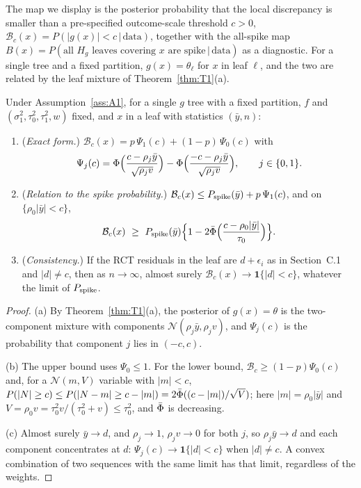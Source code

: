 \documentclass[11pt]{article}
\newcommand{\Normal}{\mathcal{N}}
\newcommand{\given}{\,\vert\,}
\theoremstyle{definition}
\theoremstyle{plain}
\begin{document}
{The map we display is the posterior probability that the local discrepancy is smaller than a pre-specified outcome-scale threshold $c>0$, $\mathcal B_c(x)=P(|g(x)|<c\given\text{data})$, together with the all-spike map $B(x)=P(\text{all }H_g\text{ leaves covering }x\text{ are spike}\given\text{data})$ as a diagnostic. For a single tree and a fixed partition, $g(x)=\theta_\ell$ for $x$ in leaf $\ell$, and the two are related by the leaf mixture of Theorem~\ref{thm:T1}(a).

\begin{thmA}\label{thm:gmap}
Under Assumption~\ref{ass:A1}, for a single $g$ tree with a fixed partition, $f$ and $(\sigma_1^2,\tau_0^2,\tau_1^2,w)$ fixed, and $x$ in a leaf with statistics $(\bar y,n)$:
\begin{enumerate}[label=(\alph*),leftmargin=2.2em]
\item (\emph{Exact form.}) $\mathcal B_c(x)=p\,\Psi_1(c)+(1-p)\,\Psi_0(c)$ with
\[
\Psi_j(c)=\Phi\Bigl(\frac{c-\rho_j\bar y}{\sqrt{\rho_jv}}\Bigr)-\Phi\Bigl(\frac{-c-\rho_j\bar y}{\sqrt{\rho_jv}}\Bigr),\qquad j\in\{0,1\}.
\]
\item (\emph{Relation to the spike probability.}) $\mathcal B_c(x)\le P_{\mathrm{spike}}(\bar y)+p\,\Psi_1(c)$, and on $\{\rho_0|\bar y|<c\}$,
\[
\mathcal B_c(x)\ \ge\ P_{\mathrm{spike}}(\bar y)\Bigl\{1-2\bar\Phi\Bigl(\frac{c-\rho_0|\bar y|}{\tau_0}\Bigr)\Bigr\}.
\]
\item (\emph{Consistency.}) If the RCT residuals in the leaf are $d+\epsilon_i$ as in Section~C.1 and $|d|\ne c$, then as $n\to\infty$, almost surely $\mathcal B_c(x)\to\mathbf 1\{|d|<c\}$, whatever the limit of $P_{\mathrm{spike}}$.
\end{enumerate}
\end{thmA}

\begin{proof}
(a) By Theorem~\ref{thm:T1}(a), the posterior of $g(x)=\theta$ is the two-component mixture with components $\Normal(\rho_j\bar y,\rho_jv)$, and $\Psi_j(c)$ is the probability that component $j$ lies in $(-c,c)$.

(b) The upper bound uses $\Psi_0\le1$. For the lower bound, $\mathcal B_c\ge(1-p)\Psi_0(c)$ and, for a $\Normal(m,V)$ variable with $|m|<c$, $P(|N|\ge c)\le P(|N-m|\ge c-|m|)=2\bar\Phi((c-|m|)/\sqrt V)$; here $|m|=\rho_0|\bar y|$ and $V=\rho_0v=\tau_0^2v/(\tau_0^2+v)\le\tau_0^2$, and $\bar\Phi$ is decreasing.

(c) Almost surely $\bar y\to d$, and $\rho_j\to1$, $\rho_jv\to0$ for both $j$, so $\rho_j\bar y\to d$ and each component concentrates at $d$: $\Psi_j(c)\to\mathbf 1\{|d|<c\}$ when $|d|\ne c$. A convex combination of two sequences with the same limit has that limit, regardless of the weights.
\end{proof}

}
\end{document}
